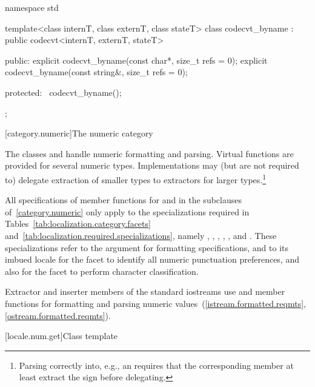 %
\begin{codeblock}
namespace std {
  template<class internT, class externT, class stateT>
    class codecvt_byname : public codecvt<internT, externT, stateT> {
    public:
      explicit codecvt_byname(const char*, size_t refs = 0);
      explicit codecvt_byname(const string&, size_t refs = 0);

    protected:
      ~codecvt_byname();
    };
}
\end{codeblock}

[category.numeric]{The numeric category}

\pnum
The classes
and
handle numeric formatting and parsing.
Virtual functions are provided for several numeric types.
Implementations may (but are not required to) delegate extraction
of smaller types to extractors for larger types.\footnote{Parsing
 correctly into, e.g., an
requires that the corresponding member
at least extract the sign before delegating.}

\pnum
All specifications of member functions for
and
in the subclauses of~\ref{category.numeric} only apply to the
specializations required in Tables~\ref{tab:localization.category.facets}
and~\ref{tab:localization.required.specializations}, namely
,
,
,
,
,
and
.
These specializations refer to the
argument for formatting specifications,
and to its imbued locale for the
facet to identify all numeric punctuation preferences,
and also for the
facet to perform character classification.

\pnum
Extractor and inserter members of the standard iostreams use
and
member functions for formatting and parsing numeric values~(\ref{istream.formatted.reqmts}, \ref{ostream.formatted.reqmts}).

[locale.num.get]{Class template }

